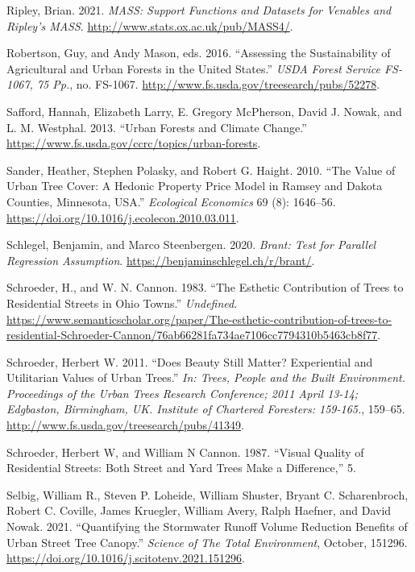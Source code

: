 \documentclass[12pt,twoside]{reedthesis}
\newlength{\cslhangindent}
\newenvironment{CSLReferences}[2] %
 {%
  \setlength{\parindent}{0pt}
  \ifodd #1 \everypar{\setlength{\hangindent}{\cslhangindent}}\ignorespaces\fi
  \ifnum #2 > 0
  \setlength{\parskip}{#2\baselineskip}
  \fi
 }%
 {}
\begin{document}
\begin{CSLReferences}{1}{0}
\leavevmode{}%
Ripley, Brian. 2021. \emph{MASS: Support Functions and Datasets for Venables and Ripley's MASS}. \url{http://www.stats.ox.ac.uk/pub/MASS4/}.

\leavevmode{}%
Robertson, Guy, and Andy Mason, eds. 2016. {``Assessing the Sustainability of Agricultural and Urban Forests in the United States.''} \emph{USDA Forest Service FS-1067, 75 Pp.}, no. FS-1067. \url{http://www.fs.usda.gov/treesearch/pubs/52278}.

\leavevmode{}%
Safford, Hannah, Elizabeth Larry, E. Gregory McPherson, David J. Nowak, and L. M. Westphal. 2013. {``Urban Forests and Climate Change.''} \url{https://www.fs.usda.gov/ccrc/topics/urban-forests}.

\leavevmode{}%
Sander, Heather, Stephen Polasky, and Robert G. Haight. 2010. {``The Value of Urban Tree Cover: A Hedonic Property Price Model in Ramsey and Dakota Counties, Minnesota, USA.''} \emph{Ecological Economics} 69 (8): 1646--56. \url{https://doi.org/10.1016/j.ecolecon.2010.03.011}.

\leavevmode{}%
Schlegel, Benjamin, and Marco Steenbergen. 2020. \emph{Brant: Test for Parallel Regression Assumption}. \url{https://benjaminschlegel.ch/r/brant/}.

\leavevmode{}%
Schroeder, H., and W. N. Cannon. 1983. {``The Esthetic Contribution of Trees to Residential Streets in Ohio Towns.''} \emph{Undefined}. \url{https://www.semanticscholar.org/paper/The-esthetic-contribution-of-trees-to-residential-Schroeder-Cannon/76ab66281fa734ae7106cc7794310b5463cb8f77}.

\leavevmode{}%
Schroeder, Herbert W. 2011. {``Does Beauty Still Matter? Experiential and Utilitarian Values of Urban Trees.''} \emph{In: Trees, People and the Built Environment. Proceedings of the Urban Trees Research Conference; 2011 April 13-14; Edgbaston, Birmingham, UK. Institute of Chartered Foresters: 159-165.}, 159--65. \url{http://www.fs.usda.gov/treesearch/pubs/41349}.

\leavevmode{}%
Schroeder, Herbert W, and William N Cannon. 1987. {``Visual Quality of Residential Streets: Both Street and Yard Trees Make a Difference,''} 5.

\leavevmode{}%
Selbig, William R., Steven P. Loheide, William Shuster, Bryant C. Scharenbroch, Robert C. Coville, James Kruegler, William Avery, Ralph Haefner, and David Nowak. 2021. {``Quantifying the Stormwater Runoff Volume Reduction Benefits of Urban Street Tree Canopy.''} \emph{Science of The Total Environment}, October, 151296. \url{https://doi.org/10.1016/j.scitotenv.2021.151296}.


\end{CSLReferences}
\end{document}
